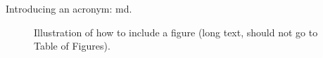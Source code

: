 Introducing an acronym: \gls{md}.

\begin{figure}[th!]
  \centering
  
  \caption[Short caption for Table of Figures]{Illustration of how to
  include a figure (long text, should not go to Table of Figures).}
  \label{fig:test}
\end{figure}

\cleardoublepage

